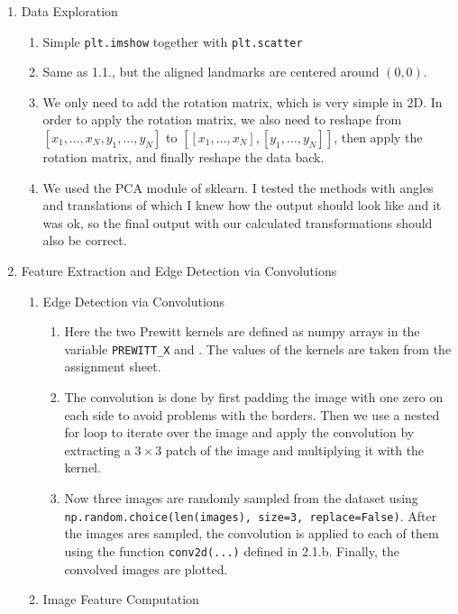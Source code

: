 \documentclass[
    a4paper,
    12pt,
    parskip=half,
]{scrarticle}
\begin{document}
\begin{enumerate}
    \item Data Exploration
    \begin{enumerate}[label=\theenumi.\arabic*.]
        \item Simple \texttt{plt.imshow} together with \texttt{plt.scatter}
        \item Same as 1.1., but the aligned landmarks are centered around \((0, 0)\).
        \item We only need to add the rotation matrix, which is very simple in 2D. In order to apply the rotation matrix,
        we also need to reshape from \([x_1, \ldots , x_N, y_1, \ldots, y_N]\) to \([[x_1, \ldots, x_N], [y_1, \ldots, y_N]]\), then apply
        the rotation matrix, and finally reshape the data back.
        \item We used the PCA module of sklearn.
        I tested the methods with angles and translations of which I knew how the output should look like and it was ok,
        so the final output with our calculated transformations should also be correct.
    \end{enumerate}

    \item Feature Extraction and Edge Detection via Convolutions
    \begin{enumerate}[label=\theenumi.\arabic*.]
        \item Edge Detection via Convolutions
        \begin{enumerate}[label=\alph*)]
            \item Here the two Prewitt kernels are defined as numpy arrays in the variable \texttt{PREWITT\_X} and .
            The values of the kernels are taken from the assignment sheet.
            \item The convolution is done by first padding the image with one zero on each side to avoid problems with the borders.
            Then we use a nested for loop to iterate over the image and apply the convolution by extracting  a \(3 \times 3\) patch of the image and multiplying it with the kernel.
            \item Now three images are randomly sampled from the dataset using \\ \texttt{np.random.choice(len(images), size=3, replace=False)}.
            After the images ares sampled, the convolution is applied to each of them using the function \texttt{conv2d(...)} defined in 2.1.b.
            Finally, the convolved images are plotted.
        \end{enumerate}
        \item Image Feature Computation
    \end{enumerate}


\end{enumerate}
\end{document}
